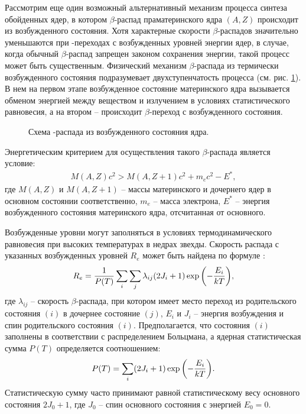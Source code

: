 Рассмотрим еще один возможный альтернативный механизм процесса синтеза обойденных ядер, в котором $\beta$-распад
праматеринского ядра $(A,Z)$ происходит из возбужденного состояния.
Хотя характерные скорости $\beta$-распадов значительно уменьшаются при \be-переходах
с возбужденных уровней энергии ядер, в случае, когда обычный $\beta$-распад
запрещен законом сохранения энергии, такой процесс может быть существенным.
Физический механизм $\beta$-распада из термически возбужденного состояния
подразумевает двухступенчатость процесса (см. рис. \ref{VOZ}).
В нем на первом этапе возбужденное
состояние материнского ядра вызывается обменом энергией между веществом и излучением в условиях
статистического равновесия, а на втором -- происходит $\beta$-переход с возбужденного состояния.

\begin{figure}
\vspace{18 true cm}
\caption{Схема \be-распада из возбужденного состояния ядра.}
\label{VOZ}
\end{figure}


Энергетическим критерием для осуществления такого $\beta$-распада является
условие:
\begin{eqnarray}\label{y_v}
M(A,Z) c^2 > M(A,Z+1) c^2 + m_e c^2 - E^*,
\end{eqnarray}
где  $M(A,Z)$ и $M(A,Z+1)$ -- массы материнского  и дочернего ядер в основном
состоянии соответственно, $m_e$ -- масса электрона,
$E^*$ -- энергия возбужденного состояния материнского ядра, отсчитанная от основного.

Возбужденные уровни могут заполняться в условиях термодинамического равновесия при высоких температурах в недрах звехды.
Скорость распада с указанных возбужденных уровней $R_e$ может быть найдена по формуле \cite{l86}:
\begin{eqnarray}\label{R_e}
R_e={{1}\over{P(T)}}\sum_i \sum_j \lambda_{ij}(2J_i+1) \exp{\left(-{{E_i}\over{kT}}\right)},
\end{eqnarray}
где $\lambda_{ij}$ -- скорость $\beta$-распада, при котором имеет место переход из
родительского состояния $(i)$ в дочернее состояние $(j)$, $E_i$ и $J_i$ --
энергия возбуждения и спин родительского состояния $(i)$. Предполагается, что
состояния $(i)$ заполнены в соответствии с распределением Больцмана, а
ядерная статистическая сумма  $P(T)$ определяется соотношением:
\begin{eqnarray}\label{P(T)}
P(T)=\sum_i (2J_i+1) \exp{\left(-{{E_i}\over{kT}}\right)}.
\end{eqnarray}
Статистическую сумму часто принимают равной статистическому весу основного
состояния $2J_0+1$, где $J_0$ -- спин основного состояния с энергией $E_0=0$.

